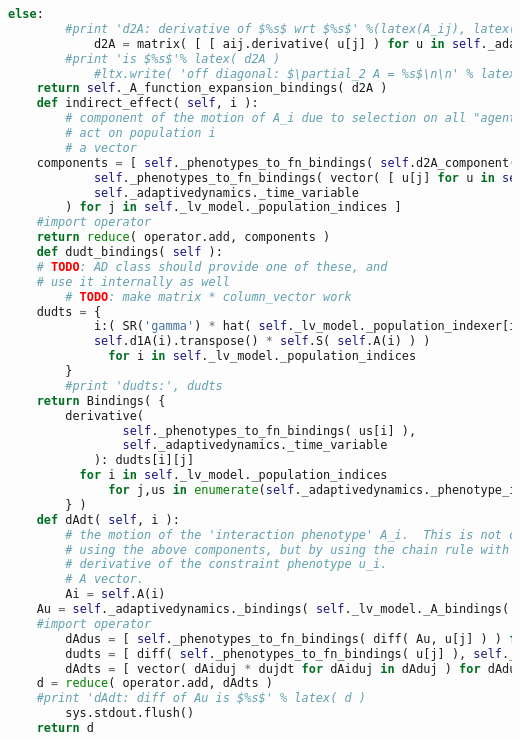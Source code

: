 \begin{lstlisting}[language=Python]
        else:
	    #print 'd2A: derivative of $%s$ wrt $%s$' %(latex(A_ij), latex(u[j]))
            d2A = matrix( [ [ aij.derivative( u[j] ) for u in self._adaptivedynamics._phenotype_indexers ] for aij in A_ij ] )
	    #print 'is $%s$'% latex( d2A )
            #ltx.write( 'off diagonal: $\partial_2 A = %s$\n\n' % latex( d2A ) )
	return self._A_function_expansion_bindings( d2A )
    def indirect_effect( self, i ):
        # component of the motion of A_i due to selection on all "agents" that
        # act on population i
        # a vector
	components = [ self._phenotypes_to_fn_bindings( self.d2A_component( i, j ) ) * derivative(
	        self._phenotypes_to_fn_bindings( vector( [ u[j] for u in self._adaptivedynamics._phenotype_indexers ] ) ),
	        self._adaptivedynamics._time_variable
	    ) for j in self._lv_model._population_indices ]
	#import operator
	return reduce( operator.add, components )
    def dudt_bindings( self ):
	# TODO: AD class should provide one of these, and
	# use it internally as well
        # TODO: make matrix * column_vector work
	dudts = {
            i:( SR('gamma') * hat( self._lv_model._population_indexer[i] ) *
	        self.d1A(i).transpose() * self.S( self.A(i) ) )
              for i in self._lv_model._population_indices
        }
        #print 'dudts:', dudts
	return Bindings( {
	    derivative(
                self._phenotypes_to_fn_bindings( us[i] ),
                self._adaptivedynamics._time_variable
            ): dudts[i][j]
	      for i in self._lv_model._population_indices
              for j,us in enumerate(self._adaptivedynamics._phenotype_indexers)
        } )
    def dAdt( self, i ):
        # the motion of the 'interaction phenotype' A_i.  This is not computed
        # using the above components, but by using the chain rule with the
        # derivative of the constraint phenotype u_i.
        # A vector.
        Ai = self.A(i)
	Au = self._adaptivedynamics._bindings( self._lv_model._A_bindings( Ai ) )
	#import operator
        dAdus = [ self._phenotypes_to_fn_bindings( diff( Au, u[j] ) ) for u in self._adaptivedynamics._phenotype_indexers for j in self._lv_model._population_indices ]
        dudts = [ diff( self._phenotypes_to_fn_bindings( u[j] ), self._adaptivedynamics._time_variable ) for u in self._adaptivedynamics._phenotype_indexers for j in self._lv_model._population_indices ]
        dAdts = [ vector( dAiduj * dujdt for dAiduj in dAduj ) for dAduj, dujdt in zip( dAdus, dudts ) ]
	d = reduce( operator.add, dAdts )
	#print 'dAdt: diff of Au is $%s$' % latex( d )
        sys.stdout.flush()
	return d

\end{lstlisting}

